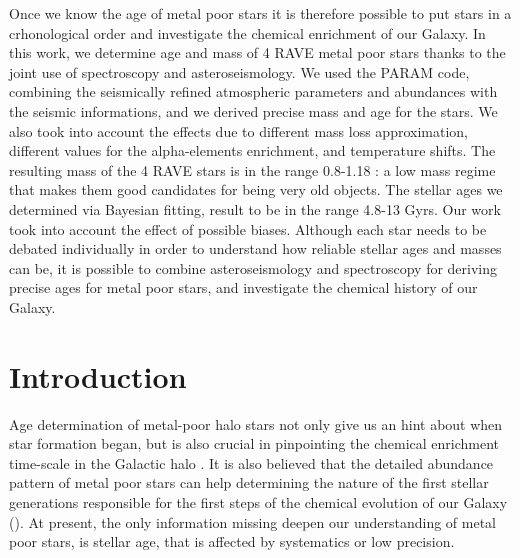 \documentclass{aa}
\begin{document}
   \date{Received ??? ??, ????; accepted ??? ??, ????}

{Once we know the age of metal poor stars it is therefore possible to put stars in a crhonological order and investigate the chemical enrichment of our Galaxy. In this work, we determine age and mass of 4 RAVE metal poor stars thanks to the joint use of spectroscopy and asteroseismology.}
{We used the PARAM code, combining the seismically refined atmospheric parameters and abundances with the seismic informations, and we derived precise mass and age for the stars. We also took into account the effects due to different mass loss approximation, different values for the alpha-elements enrichment, and temperature shifts.}
{The resulting mass of the 4 RAVE stars is in the range 0.8-1.18 \Msun: a low mass regime that makes them good candidates for being very old objects. The stellar ages we determined via Bayesian fitting, result to be in the range 4.8-13 Gyrs.}
{Our work took into account the effect of possible biases. Although each star needs to be debated individually in order to understand how reliable stellar ages and masses can be, it is possible to combine asteroseismology and spectroscopy for deriving precise ages for metal poor stars, and investigate the chemical history of our Galaxy.} 



   \maketitle
%

\section{Introduction}
Age determination of metal-poor halo stars not only give us an hint about when star formation began, but is also crucial in pinpointing the chemical enrichment time-scale in the Galactic halo \citep{Cayrel2001}. It is also believed that the detailed abundance pattern of metal poor stars can help determining the nature of the first stellar generations responsible for the first steps of the chemical evolution of our Galaxy (\citealp{Frebel2015,Chiappini2013}). At present, the only information missing deepen our understanding of metal poor stars,  is stellar age, that is affected by systematics or low precision.
\end{document}
